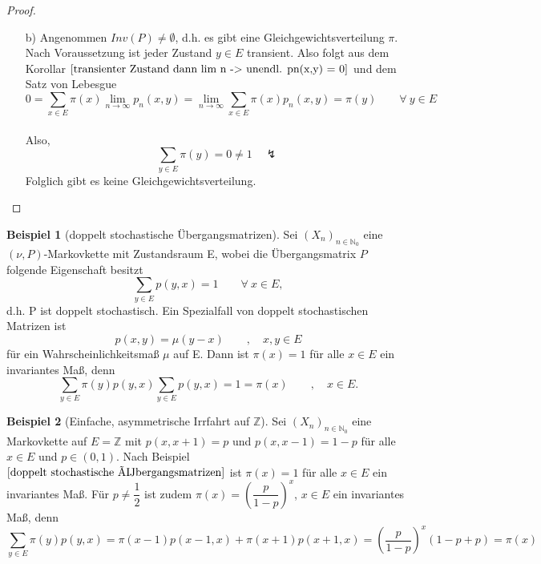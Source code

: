 \documentclass[a4paper,12pt]{scrartcl}
\theoremstyle{definition}
\newtheorem{bsp}{Beispiel}[section]
\begin{document}
\begin{proof}
\begin{itemize}
\item[b)] Angenommen $Inv(P) \neq \emptyset$, d.h. es gibt eine Gleichgewichtsverteilung $\pi$. Nach Voraussetzung ist jeder Zustand $y \in E$ transient. Also folgt aus dem Korollar $\ref{transienter Zustand dann lim n -> unendl. pn(x,y) = 0}$ und dem Satz von Lebesgue
\begin{equation*}
0 = \sum_{x \in E} \pi (x) \lim_{n \to \infty}p_{n}(x,y) = \lim_{n \to \infty} \sum_{x \in E} \pi(x) p_{n}(x,y) = \pi(y) \qquad \forall \: y \in E
\end{equation*}
\mbox{}
\\
Also,
\begin{equation*}
\sum_{y \in E} \pi (y) = 0 \neq 1 \quad \lightning
\end{equation*}
Folglich gibt es keine Gleichgewichtsverteilung.
\end{itemize}
\end{proof}
\begin{bsp}[doppelt stochastische Übergangsmatrizen]
\label{doppelt stochastische Übergangsmatrizen}
Sei $(X_{n})_{n \in \mathbb{N}_{0}}$ eine $(\nu,P)$-Markovkette mit Zustandsraum E, wobei die Übergangsmatrix $P$ folgende Eigenschaft besitzt
\begin{equation*}
\sum_{y \in E} p(y,x) = 1 \qquad \forall \: x \in E,
\end{equation*}
d.h. P ist doppelt stochastisch. Ein Spezialfall von doppelt stochastischen Matrizen ist
\begin{equation*}
 p(x,y) = \mu(y-x) \qquad, \quad x,y \in E
\end{equation*} 
für ein Wahrscheinlichkeitsmaß $\mu$ auf E. Dann ist $\pi(x) = 1$ für alle $x \in E$ ein invariantes Maß, denn 
\begin{equation*}
\sum_{y \in E} \pi(y) p(y,x) \sum_{y \in E} p(y,x) = 1 = \pi(x) \qquad , \quad x \in E.
\end{equation*}
\end{bsp}
\begin{bsp}[Einfache, asymmetrische Irrfahrt auf $\mathbb{Z}$]
\label{Einfache, asymmetrische Irrfahrt auf Z}
Sei $(X_{n})_{n \in \mathbb{N}_{0}}$ eine Markovkette auf $E=\mathbb{Z}$ mit $p(x,x+1) = p$ und $p(x,x-1)=1-p$ für alle $x \in E$ und $p \in (0,1)$. Nach Beispiel $\ref{doppelt stochastische Übergangsmatrizen}$ ist $\pi(x) = 1$ für alle $x \in E$ ein invariantes Maß. Für  $p \neq \dfrac{1}{2}$ ist zudem $\pi(x) = {\left( \dfrac{p}{1-p} \right)}^{x}$, $x \in E$ ein invariantes Maß, denn
\begin{equation*}
\sum_{y \in E} \pi(y) p(y,x) = \pi(x-1)p(x-1,x) + \pi(x+1)p(x+1,x)= {\left( \dfrac{p}{1-p} \right)}^{x}(1-p+p) = \pi(x)
\end{equation*}
\end{bsp}
\end{document}
